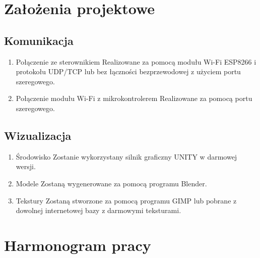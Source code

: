 \documentclass[10pt, a4paper]{article}
\begin{document}
\section{Założenia projektowe}

	\subsection{Komunikacja}
	\begin{enumerate}
		\item Połączenie ze sterownikiem
		\newline
		Realizowane za pomocą modułu Wi-Fi ESP8266 i protokołu UDP/TCP lub bez łączności bezprzewodowej z użyciem portu szeregowego.
		\item Połączenie modułu Wi-Fi z mikrokontrolerem
		\newline
		Realizowane za pomocą portu szeregowego.
	\end{enumerate}

	\subsection{Wizualizacja}
	\begin{enumerate}
		\item Środowisko
		\newline
		Zostanie wykorzystany silnik graficzny UNITY w darmowej wersji.
		\item Modele
		\newline
		Zostaną wygenerowane za pomocą programu Blender.
		\item Tekstury
		\newline
		Zostaną stworzone za pomocą programu GIMP lub pobrane z dowolnej internetowej bazy z darmowymi teksturami.
	\end{enumerate}

\newpage
\section{Harmonogram pracy}
\end{document}

